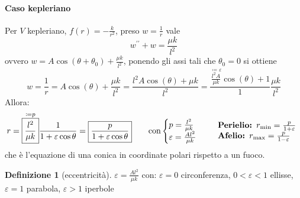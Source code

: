 \documentclass[a4paper,10pt]{article}
\theoremstyle{definition}
\theoremstyle{indentdefinition}
\newtheorem{defn}{Definizione}[section]
\theoremstyle{indenttheorem}
\theoremstyle{myremark}
\theoremstyle{indentgeneral}
\begin{document}
\paragraph{Caso kepleriano} Per $V$ kepleriano, $f\left(r\right)=-\frac{k}{r^{2}}$, preso $w=\frac{1}{r}$
vale $$w^{\prime\prime}+w=\frac{\mu k}{l^{2}}$$ ovvero $w=A\cos\left(\theta+\theta_{0}\right)+\frac{\mu k}{l^{2}}$,
ponendo gli assi tali che $\theta_{0}=0$ si ottiene 
$$w=\frac{1}{r}=A\cos\left(\theta\right)+\frac{\mu k}{l^{2}}=\frac{l^2A\cos\left(\theta\right)+\mu k}{l^2}=\frac{\overset{\coloneqq\varepsilon}{\boxed{\frac{l^2A}{\mu k}}}\cos\left(\theta\right)+1}{1}\frac{\mu k}{l^2}$$
Allora:
\begin{align*}
r & =\overset{\coloneqq p}{\boxed{\frac{l^{2}}{\mu k}}}\frac{1}{1+\varepsilon\cos\theta}=\boxed{\frac{p}{1+\varepsilon\cos\theta}}\qquad\text{con} \begin{cases}
    p=\frac{l^{2}}{\mu k} \\
    \varepsilon=\frac{Al^{2}}{\mu k}
\end{cases} & \begin{array}{l}
\text{\textbf{Perielio: }}r_{\min}=\frac{p}{1+\varepsilon}\\
\text{\textbf{Afelio: }}r_{\max}=\frac{p}{1-\varepsilon}
\end{array}
\end{align*}
che è l'equazione di una conica in coordinate polari rispetto a un fuoco.

\begin{defn}[eccentricità]
$\varepsilon=\frac{Al^{2}}{\mu k}$ con: $\varepsilon=0$ circonferenza,
$0<\varepsilon<1$ ellisse, $\varepsilon=1$ parabola, $\varepsilon>1$
iperbole
\end{defn}
\end{document}

